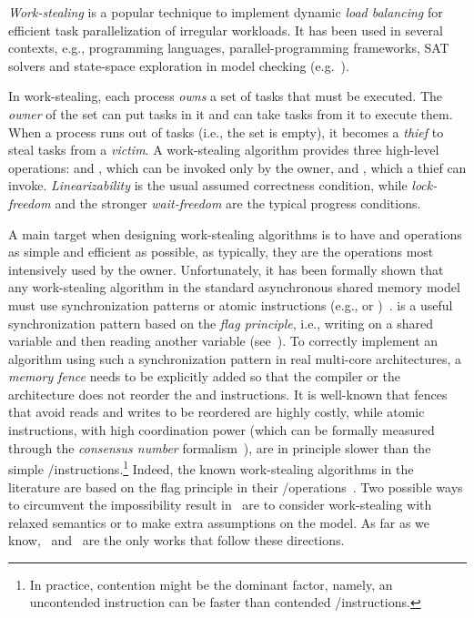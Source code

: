 \emph{Work-stealing} is a popular technique to implement dynamic \emph{load balancing} for efficient task parallelization of irregular workloads. It has been used in several contexts, e.g., programming languages, parallel-programming frameworks, SAT solvers and state-space exploration in model checking (e.g.~\cite{DBLP_journals_tpds_AyguadeCDHLMTUZ09, DBLP_journals_jpdc_BlumofeJKLRZ96, CGSDKEPS05, DBLP_conf_jvm_FloodDSZ01, DBLP_conf_pldi_FrigoLR98, DBLP_conf_java_Lea00, DBLP_conf_hpca_RangerRPBK07}).

In work-stealing, each process \emph{owns} a set of tasks that must be executed. The \emph{owner} of the set can put tasks in it and can take tasks from it to execute them. When a process runs out of tasks (i.e., the set is empty), it becomes a \emph{thief} to steal tasks from a \emph{victim}. A work-stealing algorithm provides three high-level operations: \Put and \Take, which can be invoked only by the owner, and \Steal, which a thief can invoke. \emph{Linearizability} is the usual assumed correctness condition, while \emph{lock-freedom} and the stronger \emph{wait-freedom} are the typical  progress conditions.

A main target when designing work-stealing algorithms is to have \Put and \Take operations as simple and efficient as possible, as typically, they are the operations most intensively used by the owner. Unfortunately, it has been formally shown that any work-stealing algorithm in the standard asynchronous shared memory model must use \RAW synchronization patterns or atomic \RMW instructions (e.g., \CAS or \TAS)~\cite{DBLP_journals_jacm_AttiyaGHK09}. \RAW is a useful synchronization pattern based on the \emph{flag principle}, i.e., writing on a shared variable and then reading another variable (see~\cite {DBLP_books_daglib_0020056}). To correctly implement an algorithm using such a synchronization pattern in real multi-core architectures, a \emph{memory fence} needs to be explicitly added so that the compiler or the architecture does not reorder the \R and \W instructions. It is well-known that fences that avoid reads and writes to be reordered are highly costly, while atomic \RMW instructions, with high coordination power (which can be formally measured through the \emph{consensus number} formalism~\cite{DBLP_journals_toplas_Herlihy91}), are in principle slower than the simple \R/\W instructions.\footnote{In practice, contention might be the dominant factor, namely, an uncontended \RMW instruction can be faster than contended \R/\W instructions.} Indeed, the known work-stealing algorithms in the literature are based on the flag principle in their \Take/\Steal operations~\cite{circular.work.stealing, FLR98, non.blocking.work.stealing, 10.1145.571825.571876}.  Two possible ways to circumvent the impossibility result in~\cite{DBLP_journals_jacm_AttiyaGHK09} are to consider work-stealing with relaxed semantics or to make extra assumptions on the model. As far as we know,~\cite{maged.vechev.2009} and~\cite{fencefreework} are the only works that follow these directions.

